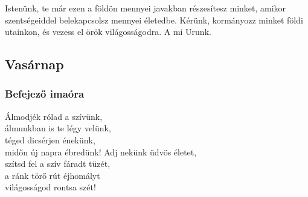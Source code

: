 \documentclass[twoside]{article}
\begin{document}

Istenünk, te már ezen a földön mennyei javakban részesítesz minket, amikor szentségeiddel %
belekapcsolsz mennyei életedbe. Kérünk, kormányozz minket földi utainkon, és vezess el örök %
világosságodra. A mi Urunk.



\subsection*{Vasárnap}


\subsubsection*{Befejező imaóra}



\begin{hymnstanzas}
  Álmodjék rólad a szívünk, \\
  álmunkban is te légy velünk, \\
  téged dicsérjen énekünk, \\
  midőn új napra ébredünk!
\stanzabreak
  Adj nekünk üdvös életet, \\
  szítsd fel a szív fáradt tüzét, \\
  a ránk törő rút éjhomályt \\
  világosságod rontsa szét!
\end{hymnstanzas}



\end{document}
